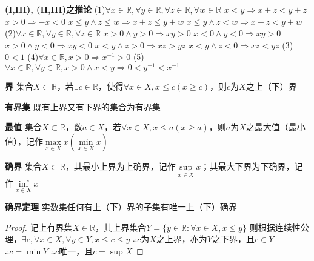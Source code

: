 \documentclass[11pt]{article}
\begin{document}
\textbf{(I,III), (II,III)之推论} \newline
(1)$\forall x \in \mathbb{R}, \forall y \in \mathbb{R}, \forall z \in \mathbb{R}, \forall w \in \mathbb{R}$ \newline
$x<y \Rightarrow x+z<y+z$ \newline
$x>0 \Rightarrow -x<0$ \newline
$x \le y \land z \le w \Rightarrow x+z \le y+w$ \newline
$x \le y \land z<w \Rightarrow x+z<y+w$ \newline
(2)$\forall x \in \mathbb{R}, \forall y \in \mathbb{R}, \forall z \in \mathbb{R}$ \newline
$x>0 \land y>0 \Rightarrow xy>0$ \newline
$x<0 \land y<0 \Rightarrow xy>0$ \newline
$x>0 \land y<0 \Rightarrow xy<0$ \newline
$x<y \land z>0 \Rightarrow xz>yz$ \newline
$x<y \land z<0 \Rightarrow xz<yz$ \newline
(3)$0<1$ \newline
(4)$\forall x \in \mathbb{R}, x>0 \Rightarrow x^{-1}>0$ \newline
(5)$\forall x \in \mathbb{R}, \forall y \in \mathbb{R}, x>0 \land x<y \Rightarrow 0<y^{-1}<x^{-1}$ \newline

\textbf{界} \newline
集合$X \subset \mathbb{R}$，若$\exists c \in \mathbb{R}$，使得$\forall x \in X, x \le c (x \ge c)$，则$c$为$X$之上（下）界 \newline

\textbf{有界集} \newline
既有上界又有下界的集合为有界集 \newline

\textbf{最值} \newline
集合$X \subset \mathbb{R}$，数$a \in X$，若$\forall x \in X, x \le a (x \ge a)$，则$a$为$X$之最大值（最小值），记作$\max\limits_{x\in X}x (\min\limits_{x\in X}x)$ \newline

\textbf{确界} \newline
集合$X \subset \mathbb{R}$，其最小上界为上确界，记作$\sup\limits_{x \in X}x$；其最大下界为下确界，记作$\inf\limits_{x \in X}x$ \newline

\textbf{确界定理} \newline
实数集任何有上（下）界的子集有唯一上（下）确界 \newline
\begin{proof}
  记上有界集$X\in\mathbb{R}$，其上界集合$Y=\{y\in\mathbb{R}:\forall x \in X, x\le y\}$ \newline
  则根据连续性公理，$\exists c, \forall x \in X, \forall y \in Y, x \le c \le y$ \newline
  $\therefore$$c$为$X$之上界，亦为$Y$之下界，且$c \in Y$ \newline
  $\therefore c=\min Y$ \newline
  $\therefore$$c$唯一，且$c=\sup X$
\end{proof}
\end{document}
